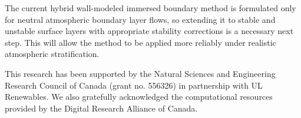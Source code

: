 \documentclass[%
superscriptaddress,
 amsmath,amssymb,
pra,
showkeys,
]{revtex4-2}
\begin{document}
The current hybrid wall-modeled immersed boundary method is formulated only for neutral atmospheric boundary layer flows, so extending it to stable and unstable surface layers with appropriate stability corrections is a necessary next step. This will allow the method to be applied more reliably under realistic atmospheric stratification.

\begin{acknowledgements}
This research has been supported by the Natural Sciences and Engineering Research Council of Canada (grant no. 556326) in partnership with UL Renewables. We also gratefully acknowledged the computational resources provided by the Digital Research Alliance of Canada. 
\end{acknowledgements} 


\end{document}
